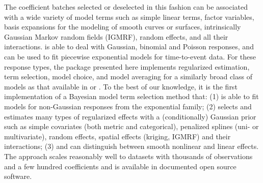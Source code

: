 \documentclass[article, shortnames, nojss, noheadings, notitle]{jss}
\begin{document}
The coefficient batches selected or deselected in this fashion can
be associated with a wide variety of model terms such as simple linear terms,
factor variables, basis expansions for the modeling of smooth
curves or surfaces, intrinsically Gaussian Markov random fields (IGMRF), random effects, and
all their interactions.   is able to deal with Gaussian, binomial and Poisson responses,
and can be used to fit piecewise exponential models for time-to-event data.
For these response types, the package presented here implements regularized estimation,
term selection, model choice, and model averaging for a similarly broad class of models as that
available in  \citep{mboost} or  \citep{bayesx}.
To the best of our knowledge, it is the first implementation of a
Bayesian model term selection method that:
(1) is able to fit models for non-Gaussian responses from the exponential family;
(2) selects and estimates many types of regularized effects with a
(conditionally) Gaussian prior such as simple covariates (both
metric and categorical), penalized splines (uni- or multivariate),
random effects, spatial effects (kriging, IGMRF) and their interactions; (3) and can
distinguish between smooth nonlinear and linear effects.
The approach scales reasonably well to datasets with thousands
of observations and a few hundred coefficients and
is available in documented open source software.
%
\end{document}
